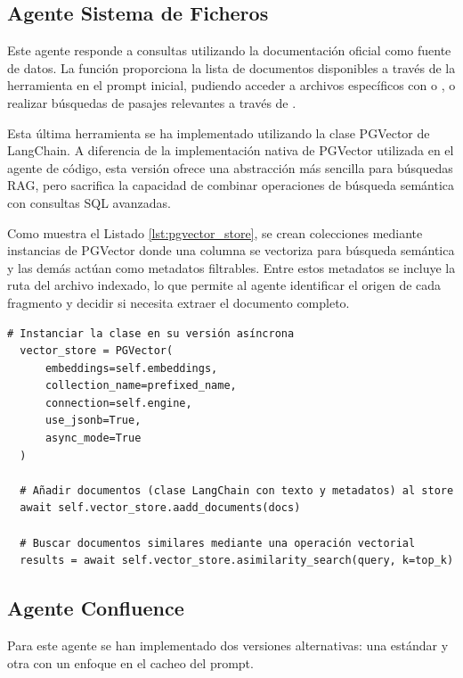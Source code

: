 \subsection{Agente Sistema de Ficheros}
\label{sec:agente_filesystem}
Este agente responde a consultas utilizando la documentación oficial como fuente de datos. La función  proporciona la lista de documentos disponibles a través de la herramienta  en el prompt inicial, pudiendo acceder a archivos específicos con  o , o realizar búsquedas de pasajes relevantes a través de .

Esta última herramienta se ha implementado utilizando la clase PGVector de LangChain. A diferencia de la implementación nativa de PGVector utilizada en el agente de código, esta versión ofrece una abstracción más sencilla para búsquedas RAG, pero sacrifica la capacidad de combinar operaciones de búsqueda semántica con consultas SQL avanzadas.

Como muestra el Listado \ref{lst:pgvector_store}, se crean colecciones mediante instancias de PGVector donde una columna se vectoriza para búsqueda semántica y las demás actúan como metadatos filtrables. Entre estos metadatos se incluye la ruta del archivo indexado, lo que permite al agente identificar el origen de cada fragmento y decidir si necesita extraer el documento completo.

\begin{lstlisting}[caption={\protect\opus{PGVector}: uso de clase para indexar o buscar documentos}, label={lst:pgvector_store}]
  # Instanciar la clase en su versión asíncrona 
  vector_store = PGVector(
      embeddings=self.embeddings,
      collection_name=prefixed_name,
      connection=self.engine,
      use_jsonb=True,
      async_mode=True
  )

  # Añadir documentos (clase LangChain con texto y metadatos) al store
  await self.vector_store.aadd_documents(docs)

  # Buscar documentos similares mediante una operación vectorial
  results = await self.vector_store.asimilarity_search(query, k=top_k)
\end{lstlisting}

\subsection{Agente Confluence}
Para este agente se han implementado dos versiones alternativas: una estándar y otra con un enfoque en el cacheo del prompt.


